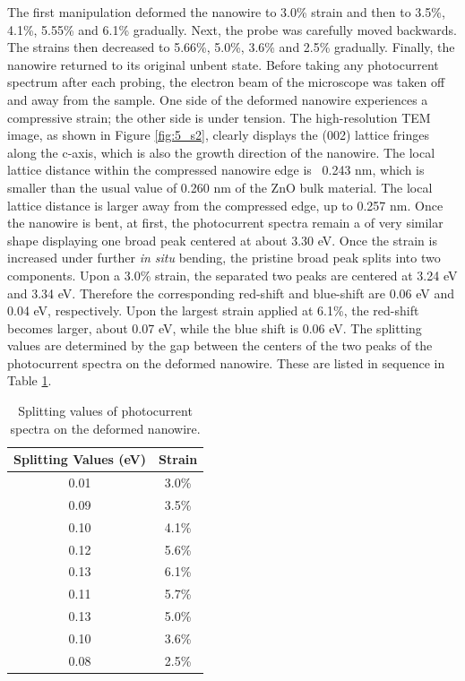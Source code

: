 The first manipulation deformed the nanowire to 3.0\% strain and then to 3.5\%, 4.1\%, 5.55\% and 6.1\% gradually. 
Next, the probe was carefully moved backwards. 
The strains then decreased to 5.66\%, 5.0\%, 3.6\% and 2.5\% gradually. 
Finally, the nanowire returned to its original unbent state. 
Before taking any photocurrent spectrum after each probing, the electron beam of the microscope was taken off and away from the sample. 
One side of the deformed nanowire experiences a compressive strain; the other side is under tension. 
The high-resolution TEM image, as shown in Figure \ref{fig:5_s2}, clearly displays the (002) lattice fringes along the c-axis, which is also the growth direction of the nanowire.\cite{zhang2015opto} 
The local lattice distance within the compressed nanowire edge is ~0.243 nm, which is smaller than the usual value of 0.260 nm of the ZnO bulk material.\cite{L.2011} 
The local lattice distance is larger away from the compressed edge, up to 0.257 nm. 
Once the nanowire is bent, at first, the photocurrent spectra remain a of very similar shape displaying one broad peak centered at about 3.30 eV. 
Once the strain is increased under further \textit{in situ} bending, the pristine broad peak splits into two components. 
Upon a 3.0\% strain, the separated two peaks are centered at 3.24 eV and 3.34 eV. 
Therefore the corresponding red-shift and blue-shift are 0.06 eV and 0.04 eV, respectively. 
Upon the largest strain applied at 6.1\%, the red-shift becomes larger, about 0.07 eV, while the blue shift is 0.06 eV. 
The splitting values are determined by the gap between the centers of the two peaks of the photocurrent spectra on the deformed nanowire. These are listed in sequence in Table \ref{tab:5_1}. 
\begin{table}
    \centering
    \begin{tabular}{c|c}
    \hline
         Splitting Values (eV) & Strain\\
         \hline
         0.01 & 3.0\%\\ 
         0.09 & 3.5\%\\
         0.10 & 4.1\%\\
         0.12 & 5.6\%\\
         0.13 & 6.1\%\\
         0.11 & 5.7\%\\
         0.13 & 5.0\%\\
         0.10 & 3.6\%\\
         0.08 & 2.5\%\\
         \hline
    \end{tabular}
    \caption{Splitting values of photocurrent spectra on the deformed nanowire.}
    \label{tab:5_1}
\end{table}
 
